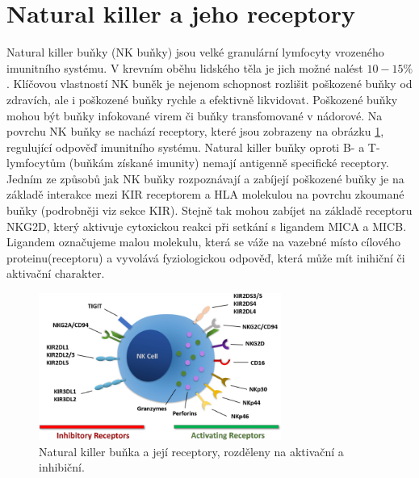 \documentclass[czech,DP]{thesiskiv}
\numberwithin{equation}{section}
\begin{document}
\section{Natural killer a jeho receptory}
Natural killer buňky (NK buňky) jsou velké granulární lymfocyty vrozeného imunitního systému. V krevním oběhu lidského těla je jich možné nalést $10-15\%$. Klíčovou vlastností NK buněk je nejenom schopnost rozlišit poškozené buňky od zdravích, ale i poškozené buňky rychle a efektivně likvidovat. Poškozené buňky mohou být buňky infokované virem či buňky transfomované v nádorové. Na povrchu NK buňky se nachází receptory, které jsou zobrazeny na obrázku \ref{fig:NK_receptors}, regulující odpověď imunitního systému. Natural killer buňky oproti B- a T- lymfocytům (buňkám získané imunity) nemají antigenně specifické receptory. Jedním ze způsobů jak NK buňky rozpoznávají a zabíjejí poškozené buňky je na základě interakce mezi KIR receptorem a HLA molekulou na povrchu zkoumané buňky (podrobněji viz sekce KIR). Stejně tak mohou zabíjet na základě receptoru NKG2D, který aktivuje cytoxickou reakci při setkání s ligandem MICA a MICB. Ligandem označujeme malou molekulu, která se váže na vazebné místo cílového proteinu(receptoru) a vyvolává fyziologickou odpověď, která může mít inihiční či aktivační charakter. 
\begin{figure}[H]		
		\centering
		\includegraphics[width=300px]{./img/nk_receptory.jpg}
		\caption{Natural killer buňka a její receptory, rozděleny na aktivační a inhibiční.\cite{NK_receptors} }
		\label{fig:NK_receptors}
\end{figure}
\end{document}
